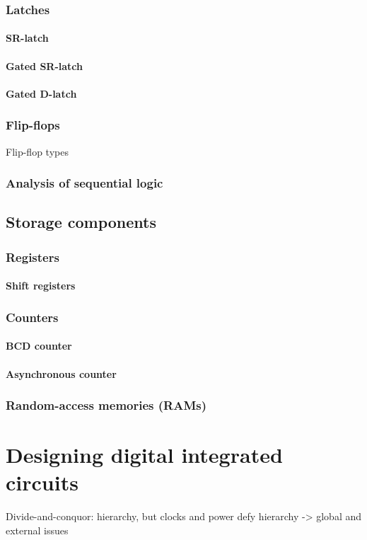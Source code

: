 \documentclass{report}
\begin{document}
\subsection{Latches}
\subsubsection{SR-latch}
\subsubsection{Gated SR-latch}
\subsubsection{Gated D-latch}
\subsection{Flip-flops}
Flip-flop types
\subsection{Analysis of sequential logic}
\section{Storage components}
\subsection{Registers}
\subsubsection{Shift registers}
\subsection{Counters}
\subsubsection{BCD counter}
\subsubsection{Asynchronous counter}
\subsection{Random-access memories (RAMs)}

\chapter{Designing digital integrated circuits}
Divide-and-conquor: hierarchy, but clocks and power defy hierarchy -> global and external issues
\end{document}
